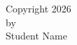 \newpage
\phantom{Free space for short editorial comments.} \vglue -14pt
\vfill
\begin{center}
  Copyright 2026\\ by\\ Student Name
\end{center}
\vfill
\newpage


